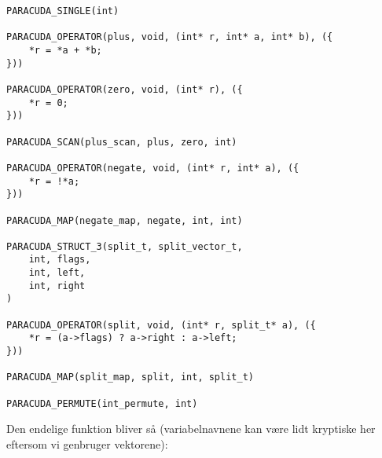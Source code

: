 \begin{verbatim}
PARACUDA_SINGLE(int)

PARACUDA_OPERATOR(plus, void, (int* r, int* a, int* b), ({
    *r = *a + *b;
}))

PARACUDA_OPERATOR(zero, void, (int* r), ({
    *r = 0;
}))

PARACUDA_SCAN(plus_scan, plus, zero, int)

PARACUDA_OPERATOR(negate, void, (int* r, int* a), ({
    *r = !*a;
}))

PARACUDA_MAP(negate_map, negate, int, int)

PARACUDA_STRUCT_3(split_t, split_vector_t,
    int, flags, 
    int, left,
    int, right
)

PARACUDA_OPERATOR(split, void, (int* r, split_t* a), ({
    *r = (a->flags) ? a->right : a->left;	
}))

PARACUDA_MAP(split_map, split, int, split_t)

PARACUDA_PERMUTE(int_permute, int)
\end{verbatim}

Den endelige funktion bliver så (variabelnavnene kan
være lidt kryptiske her eftersom vi genbruger vektorene):

